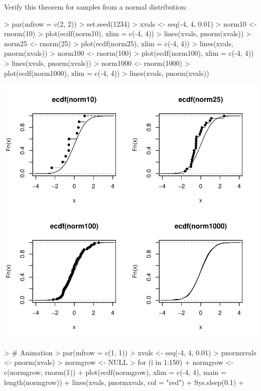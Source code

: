 \documentclass[12pt,letterpaper,final]{article}
\begin{document}
Verify this theorem for samples from a normal distribution:

\begin{Schunk}
\begin{Sinput}
> par(mfrow = c(2, 2))
> set.seed(1234) 
> xvals <- seq(-4, 4, 0.01)
> norm10 <- rnorm(10)
> plot(ecdf(norm10), xlim = c(-4, 4))
> lines(xvals, pnorm(xvals))
> norm25 <- rnorm(25)
> plot(ecdf(norm25), xlim = c(-4, 4))
> lines(xvals, pnorm(xvals))
> norm100 <- rnorm(100)
> plot(ecdf(norm100), xlim = c(-4, 4))
> lines(xvals, pnorm(xvals))
> norm1000 <- rnorm(1000)
> plot(ecdf(norm1000), xlim = c(-4, 4))
> lines(xvals, pnorm(xvals))
\end{Sinput}
\end{Schunk}
\includegraphics{lect_main-035}


\begin{Schunk}
\begin{Sinput}
> # Animation
> par(mfrow = c(1, 1))
> xvals <- seq(-4, 4, 0.01)
> pnormxvals <- pnorm(xvals)
> normgrow <- NULL
> for (i in 1:150) {
+   normgrow <- c(normgrow, rnorm(1))
+   plot(ecdf(normgrow), xlim = c(-4, 4), main = length(normgrow))
+   lines(xvals, pnormxvals, col = "red")
+   Sys.sleep(0.1)
+ }
\end{Sinput}
\end{Schunk}
\end{document}
